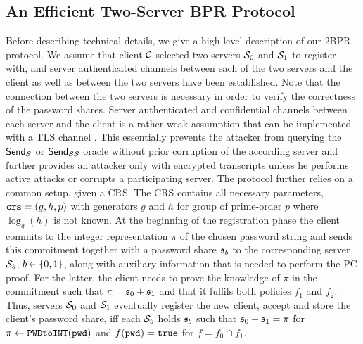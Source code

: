 
\subsection{An Efficient Two-Server BPR Protocol}\label{sec:framework}
Before describing technical details, we give a high-level description of our \ac{2BPR} protocol.
We assume that client $\mathcal{C}$ selected two servers $\mathcal{S}_0$ and $\mathcal{S}_1$ to register with, and server authenticated channels between each of the two servers and the client as well as between the two servers have been established.
Note that the connection between the two servers is necessary in order to verify the correctness of the password shares.
Server authenticated and confidential channels between each server and the client is a rather weak assumption that can be implemented with a \ac{TLS} channel \cite{rfc5246,JagerKSS12,KrawczykPW13}.
This essentially prevents the attacker from querying the $\mathsf{Send}_\mathcal{S}$ or $\mathsf{Send}_{\mathcal{S}\mathcal{S}}$ oracle without prior corruption of the according server and further provides an attacker only with encrypted transcripts unless he performs active attacks or corrupts a participating server.
The protocol further relies on a common setup, given a \ac{CRS}.
The \ac{CRS} contains all necessary parameters, \ie $\mathtt{crs}=(g, h, p)$ with generators $g$ and $h$ for group of prime-order $p$ where $\log_g(h)$ is not known.
At the beginning of the registration phase the client commits to the integer representation $\pi$ of the chosen password string \pwd and sends this commitment together with a password share $\mathfrak{s}_b$ to the corresponding server $\mathcal{S}_b$, $b\in\{0,1\}$, along with auxiliary information that is needed to perform the \ac{PC} proof.
For the latter, the client needs to prove the knowledge of $\pi$ in the commitment such that $\pi = \mathfrak{s}_0 + \mathfrak{s}_1$ and that it fulfils both policies $f_1$ and $f_2$.
Thus, servers $\mathcal{S}_0$ and $\mathcal{S}_1$ eventually register the new client, accept and store the client's password share, iff each $\mathcal{S}_b$ holds $\mathfrak{s}_b$ such that $\mathfrak{s}_0+\mathfrak{s}_1=\pi$ for $\pi\gets\texttt{PWDtoINT}(\mathtt{pwd})$ and $f(\mathtt{pwd})=\mathtt{true}$ for $f=f_0\cap f_1$.

